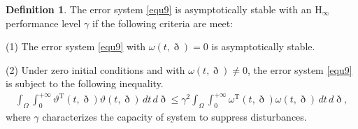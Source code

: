 \documentclass[preprint,review,fleqn,sort&compress,3p]{elsarticle}
\theoremstyle{definition}%
\newtheorem{Def}{Definition}[section]
\begin{document}
	\begin{Def}\label{Def1}
		The error system \eqref{equ9} is asymptotically stable with an  $\text{H}_\infty$ performance level $\gamma$ if the following criteria are meet:
		
		(1) The error system \eqref{equ9} with $\omega(t,\eth)=0$ is asymptotically stable.
		
		(2) Under zero initial conditions and with $\omega(t,\eth)\neq 0$, the error system \eqref{equ9} is subject to the following inequality.
		\begin{align*}
			\int_{\Omega} \int_{0}^{+\infty} \vartheta^\text{T}(t, \eth) \vartheta(t, \eth) \, dt \, d\eth \leq \gamma^2 \int_{\Omega} \int_{0}^{+\infty} \omega^\text{T}(t, \eth) \omega(t, \eth) \, dt \, d\eth,
		\end{align*}
	where $\gamma$ characterizes the capacity of system to suppress disturbances.
	\end{Def}
	
\end{document}
